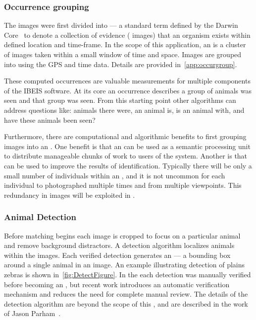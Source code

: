         \subsubsection{Occurrence grouping}
            The images were first divided into \glossterm{\occurrences{}} --- a standard term defined by the Darwin
            Core~\cite{wieczorek_darwin_2012} to denote a collection of evidence (\eg{} images) that an organism exists
            within defined location and time-frame. In the scope of this application, an \occurrence{} is a cluster of
            images taken within a small window of time and space. Images are grouped into \occurrences{} using the GPS
            and time data. Details are provided in~\cref{app:occurgroup}.

            These computed occurrences are valuable measurements for multiple components of the IBEIS software.
            At its core an occurrence describes  a group of animals was seen and  that
              group was seen.
            From this starting point other algorithms can address questions like:
             animals there were,  an animal is,  is an animal with,
              and  have these animals been seen?
            
            Furthermore, there are computational and algorithmic benefits to first grouping images into an
              \occurrence{}.
            One benefit is that an \occurrence{} can be used as a semantic processing unit to distribute
              manageable chunks of work to users of the system.
            Another is that \occurrences{} can be used to improve the results of identification.
            Typically there will be only a small number of individuals within an \occurrence{}, and it is not
              uncommon for each individual to photographed multiple times and from multiple viewpoints.
            This redundancy in images will be exploited in .

        \subsubsection{Animal Detection}
            Before matching begins each image is cropped to focus on a particular animal and remove background
            distractors. A detection algorithm localizes animals within the images. Each verified detection
            generates an \glossterm{\annot{}} --- a bounding box around a single animal in an image. An example
            illustrating detection of plains zebras is shown in~\cref{fig:DetectFigure}. In the \GZC{} each
            detection was manually verified before becoming an \annot{}, but recent work introduces an automatic
            verification mechanism and reduces the need for complete manual review. The details of the detection
            algorithm are beyond the scope of this \thesis{}, and are described in the work of Jason
            Parham~\cite{parham_photographic_2015,parham_detecting_2016}.

